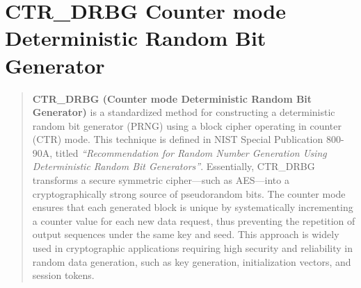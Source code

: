 \section{CTR\_DRBG Counter mode Deterministic Random Bit Generator}
\label{sec:counter_mode_deterministic_random_bit_generator}

\begin{quote}
\textbf{CTR\_DRBG (Counter mode Deterministic Random Bit Generator)} is a standardized method for constructing a deterministic random bit generator (PRNG) using a block cipher operating in counter (CTR) mode. This technique is defined in NIST Special Publication 800-90A, titled \textit{``Recommendation for Random Number Generation Using Deterministic Random Bit Generators''}. Essentially, CTR\_DRBG transforms a secure symmetric cipher---such as AES---into a cryptographically strong source of pseudorandom bits. The counter mode ensures that each generated block is unique by systematically incrementing a counter value for each new data request, thus preventing the repetition of output sequences under the same key and seed. This approach is widely used in cryptographic applications requiring high security and reliability in random data generation, such as key generation, initialization vectors, and session tokens.
\end{quote}

